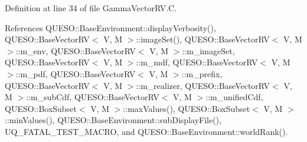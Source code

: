 Definition at line 34 of file Gamma\-Vector\-R\-V.\-C.



References Q\-U\-E\-S\-O\-::\-Base\-Environment\-::display\-Verbosity(), Q\-U\-E\-S\-O\-::\-Base\-Vector\-R\-V$<$ V, M $>$\-::image\-Set(), Q\-U\-E\-S\-O\-::\-Base\-Vector\-R\-V$<$ V, M $>$\-::m\-\_\-env, Q\-U\-E\-S\-O\-::\-Base\-Vector\-R\-V$<$ V, M $>$\-::m\-\_\-image\-Set, Q\-U\-E\-S\-O\-::\-Base\-Vector\-R\-V$<$ V, M $>$\-::m\-\_\-mdf, Q\-U\-E\-S\-O\-::\-Base\-Vector\-R\-V$<$ V, M $>$\-::m\-\_\-pdf, Q\-U\-E\-S\-O\-::\-Base\-Vector\-R\-V$<$ V, M $>$\-::m\-\_\-prefix, Q\-U\-E\-S\-O\-::\-Base\-Vector\-R\-V$<$ V, M $>$\-::m\-\_\-realizer, Q\-U\-E\-S\-O\-::\-Base\-Vector\-R\-V$<$ V, M $>$\-::m\-\_\-sub\-Cdf, Q\-U\-E\-S\-O\-::\-Base\-Vector\-R\-V$<$ V, M $>$\-::m\-\_\-unified\-Cdf, Q\-U\-E\-S\-O\-::\-Box\-Subset$<$ V, M $>$\-::max\-Values(), Q\-U\-E\-S\-O\-::\-Box\-Subset$<$ V, M $>$\-::min\-Values(), Q\-U\-E\-S\-O\-::\-Base\-Environment\-::sub\-Display\-File(), U\-Q\-\_\-\-F\-A\-T\-A\-L\-\_\-\-T\-E\-S\-T\-\_\-\-M\-A\-C\-R\-O, and Q\-U\-E\-S\-O\-::\-Base\-Environment\-::world\-Rank().


